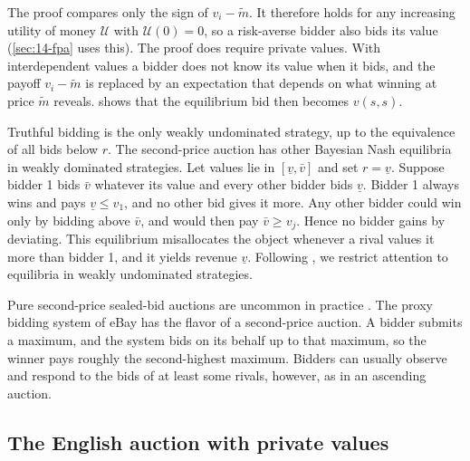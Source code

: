 \begin{remark}\label{rem:14-spa-needs}
The proof compares only the sign of $v_i-\tilde m$. It therefore holds for any increasing utility of money
$\mathcal{U}$ with $\mathcal{U}(0)=0$, so a risk-averse bidder also bids its value (\cref{sec:14-fpa} uses
this). The proof does require private values. With interdependent values a bidder does not know its value
when it bids, and the payoff $v_i-\tilde m$ is replaced by an expectation that depends on what winning at
price $\tilde m$ reveals.  shows that the equilibrium bid then becomes $v(s,s)$.
\end{remark}

\begin{remark}\label{rem:14-spa-other}
Truthful bidding is the only weakly undominated strategy, up to the equivalence of all bids below $r$.
The second-price auction has other Bayesian Nash equilibria in weakly dominated strategies. Let values lie in $[\underline v,\bar v]$ and set
$r=\underline v$. Suppose bidder 1 bids $\bar v$ whatever its value and every other bidder bids
$\underline v$. Bidder 1 always wins and pays $\underline v\le v_1$, and no other bid gives it more. Any other
bidder could win only by bidding above $\bar v$, and would then pay $\bar v\ge v_j$. Hence no bidder gains by
deviating. This equilibrium misallocates the object whenever a rival values it more than bidder 1, and it
yields revenue $\underline v$. Following \citet[Section~2.2]{AtheyHaile2007}, we restrict attention to
equilibria in weakly undominated strategies.
\end{remark}

\begin{remark}
Pure second-price sealed-bid auctions are uncommon in practice \citep[footnote~2]{AtheyHaile2007}. The
proxy bidding system of eBay has the flavor of a second-price auction. A bidder submits a maximum, and the
system bids on its behalf up to that maximum, so the winner pays roughly the second-highest maximum. Bidders
can usually observe and respond to the bids of at least some rivals, however, as in an ascending auction.
\end{remark}

\subsection{The English auction with private values}\label{sec:14-english-pv}

